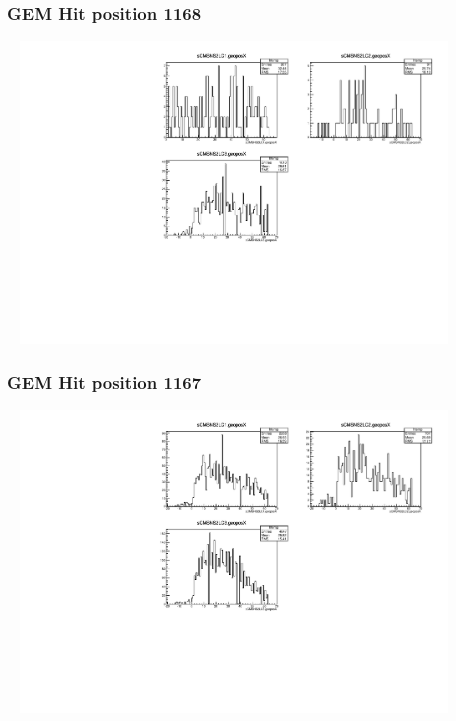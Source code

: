 \documentclass[slidestop,compress,mathserif]{beamer}
\begin{document}
\begin{frame}\frametitle{GEM Hit position 1168}
	 \includegraphics[width=12cm,height=8cm]{GEM_Hit_position_1168.pdf}
\end{frame}
\begin{frame}\frametitle{GEM Hit position 1167}
	 \includegraphics[width=12cm,height=8cm]{GEM_Hit_position_1167.pdf}
\end{frame}
\end{document}
